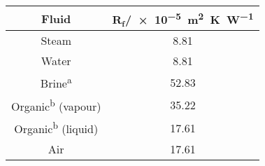 \begin{tabular}{|c c |}
    \hline
    \rowcolor{bluepoli!40} %
    \textbf{Fluid} & \(\mathbf{R_f}\)/\qty{e-5}{\square\m\K\per\watt} \T\B \\
    \hline \hline
    Steam & 8.81 \T\B \\
    Water & 8.81 \T\B \\
    Brine\textsuperscript{a} & 52.83 \T\B \\
    Organic\textsuperscript{b} (vapour) & 35.22 \T\B \\
    Organic\textsuperscript{b} (liquid) & 17.61 \T\B \\
    Air & 17.61 \T\B \\

    \hline
\end{tabular}
